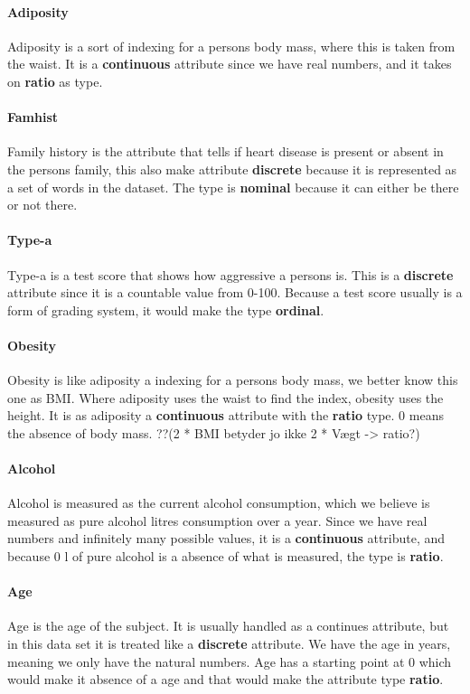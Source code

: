\paragraph{Adiposity} Adiposity is a sort of indexing for a persons body mass, where this is taken from the waist. It is a \textbf{continuous} attribute since we have real numbers, and it takes on \textbf{ratio} as type.

\paragraph{Famhist} Family history is the attribute that tells if heart disease is present or absent in the persons family, this also make attribute \textbf{discrete} because it is represented as a set of words in the dataset. The type is \textbf{nominal} because it can either be there or not there.

\paragraph{Type-a} Type-a is a test score that shows how aggressive a persons is. This is a \textbf{discrete} attribute since it is a countable value from 0-100. Because a test score usually is a form of grading system, it would make the type \textbf{ordinal}.

\paragraph{Obesity} Obesity is like adiposity a indexing for a persons body mass, we better know this one as BMI. Where adiposity uses the waist to find the index, obesity uses the height. It is as adiposity a \textbf{continuous} attribute with the \textbf{ratio} type. 0 means the absence of body mass. ??(2 * BMI betyder jo ikke 2 * Vægt -> ratio?)

\paragraph{Alcohol} Alcohol is measured as the current alcohol consumption, which we believe is measured as pure alcohol litres consumption over a year. Since we have real numbers and infinitely many possible values, it is a \textbf{continuous} attribute, and because 0 l of pure alcohol is a absence of what is measured, the type is \textbf{ratio}.

\paragraph{Age} Age is the age of the subject. It is usually handled as a continues attribute, but in this data set it is treated like a \textbf{discrete} attribute. We have the age in years, meaning we only have the natural numbers. Age has a starting point at 0 which would make it absence of a age and that would make the attribute type \textbf{ratio}.

